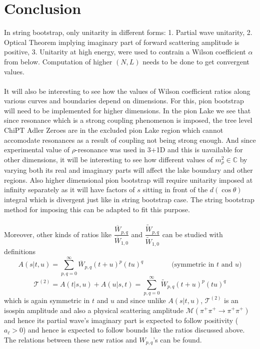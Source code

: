 ﻿\documentclass[12pt,a4paper]{article}
\begin{document}
\section{Conclusion}
In string bootstrap, only unitarity in different forms: 1. Partial wave unitarity, 2. Optical Theorem implying imaginary part of forward scattering amplitude is positive, 3. Unitarity at high energy, were used to contrain a Wilson coefficient $\alpha$ from below. Computation of higher $(N,L)$ needs to be done to get convergent values.\\\\
It will also be interesting to see how the values of Wilson coefficient ratios along various curves and boundaries depend on dimensions. For this, pion bootstrap will need to be implemented for higher dimensions. In the pion Lake we see that since resonance which is a strong coupling phenomenon is imposed, the tree level ChiPT Adler Zeroes are in the excluded pion Lake region which cannot accomodate resonances as a result of coupling not being strong enough. And since experimental value of $\rho$-resonance was used in 3+1D and this is uavailable for other dimensions, it will be interesting to see how different values of $m_{\rho}^{2}\in \mathbb{C}$ by varying both its real and imaginary parts will affect the lake boundary and other regions. Also higher dimensional pion bootstrap will require unitarity imposed at infinity separately as it will have factors of $s$ sitting in front of the $d(\cos\theta)$ integral which is divergent just like in string bootstrap case. The string bootstrap method for imposing this can be adapted to fit this purpose.\\\\
Moreover, other kinds of ratios like $\dfrac{\overline{W}_{p,q}}{\overline{W}_{1,0}}$ and $\dfrac{\widetilde W_{p,q}}{\widetilde W_{1,0}}$ can be studied with definitions
$$
A(s|t,u)=\sum_{p,q=0}^{\infty} \overline{W}_{p, q} (t+u)^{p} (tu)^{q} \qquad \qquad \text{(symmetric in $t$ and $u$)}
$$
$$
\mathcal{T}^{(2)}=A(t|s,u)+A(u|s,t)=\sum_{p,q=0}^{\infty} \widetilde W_{p, q} (t+u)^{p} (tu)^{q}
$$
which is again symmetric in $t$ and $u$ and since unlike $A(s|t,u)$, $\mathcal{T}^{(2)}$ is an isospin amplitude and also a physical scattering amplitude $\mathcal{M}(\pi^{+}\pi^{+}\rightarrow \pi^{+}\pi^{+})$ and hence its partial wave's imaginary part is expected to follow positivity ($a_{\ell}>0$) and hence is expected to follow bounds like the ratios discussed above. The relations between these new ratios and $W_{p,q}$'s can be found. 
\end{document}
